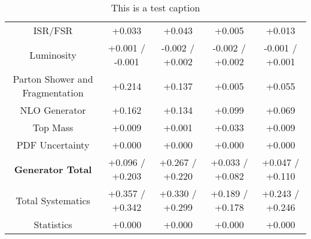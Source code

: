 \begin{table}[htbp]
\begin{center}
\begin{tabular}{|c|c|c|c|c|}
ISR/FSR                               &+0.033              & +0.043              & +0.005              & +0.013             \\
Luminosity                            &+0.001   / -0.001   & -0.002   / +0.002   & -0.002   / +0.002   & -0.001   / +0.001  \\
Parton Shower and Fragmentation       &+0.214              & +0.137              & +0.005              & +0.055             \\
NLO Generator                         &+0.162              & +0.134              & +0.099              & +0.069             \\
Top Mass                              &+0.009              & +0.001              & +0.033              & +0.009             \\
PDF Uncertainty                       &+0.000              & +0.000              & +0.000              & +0.000             \\
\hline
\textbf{Generator Total}              &+0.096   / +0.203   & +0.267   / +0.220   & +0.033   / +0.082   & +0.047   / +0.110  \\
\hline
\hline
Total Systematics                     &+0.357   / +0.342   & +0.330   / +0.299   & +0.189   / +0.178   & +0.243   / +0.246  \\
Statistics                            &+0.000              & +0.000              & +0.000              & +0.000             \\
\hline
  \end{tabular}
  \end{center} 
  \label{tab:fsm_nominal_coscos_op}
  \caption{This is a test caption}
\end{table}
 


